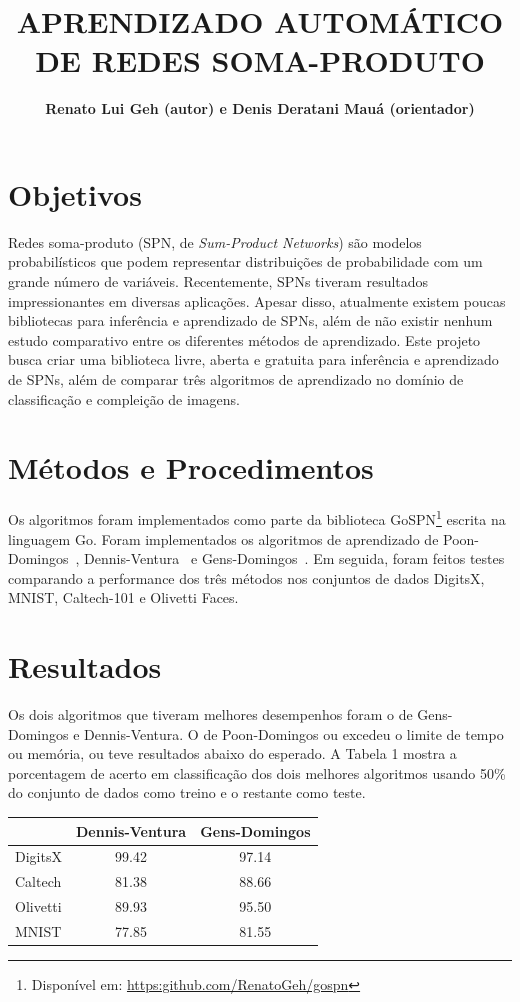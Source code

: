 \documentclass[10pt,a4paper]{article}
\title{APRENDIZADO AUTOMÁTICO DE REDES SOMA-PRODUTO}
\author{\textbf{Renato Lui Geh (autor) e Denis Deratani Mauá (orientador)}}
\affil{Instituto de Matemática e Estatística, Universidade de São Paulo}
\affil{\fontsize{10pt}{12}\selectfont\{renatolg,ddm\}@ime.usp.br}
\date{}
\begin{document}
\maketitle

\begin{multicols*}{2}

\section*{Objetivos}

Redes soma-produto (SPN, de \textit{Sum-Product Networks}) são modelos probabilísticos que podem
representar distribuições de probabilidade com um grande número de variáveis.  Recentemente, SPNs
tiveram resultados impressionantes em diversas aplicações.  Apesar disso, atualmente existem poucas
bibliotecas para inferência e aprendizado de SPNs, além de não existir nenhum estudo comparativo
entre os diferentes métodos de aprendizado.  Este projeto busca criar uma biblioteca livre, aberta
e gratuita para inferência e aprendizado de SPNs, além de comparar três algoritmos de aprendizado
no domínio de classificação e compleição de imagens.

\section*{Métodos e Procedimentos}

Os algoritmos foram implementados como parte da biblioteca GoSPN\footnote{Disponível em:
  \url{https:github.com/RenatoGeh/gospn}} escrita na linguagem Go.  Foram implementados os
algoritmos de aprendizado de Poon-Domingos~\cite{poon-domingos}, Dennis-Ventura~\cite{clustering} e
Gens-Domingos~\cite{gens-domingos}. Em seguida, foram feitos testes comparando a performance dos
três métodos nos conjuntos de dados DigitsX, MNIST, Caltech-101 e Olivetti Faces.

\section*{Resultados}

Os dois algoritmos que tiveram melhores desempenhos foram o de Gens-Domingos e Dennis-Ventura. O de
Poon-Domingos ou excedeu o limite de tempo ou memória, ou teve resultados abaixo do esperado. A
Tabela 1 mostra a porcentagem de acerto em classificação dos dois melhores algoritmos usando 50\%
do conjunto de dados como treino e o restante como teste.
\vspace{-0.2cm}
\begin{tabular}{l|c|c}
  & Dennis-Ventura & Gens-Domingos\\
  \hline
  DigitsX & 99.42 & 97.14\\
  Caltech & 81.38 & 88.66\\
  Olivetti& 89.93 & 95.50\\
  MNIST   & 77.85 & 81.55\\
\end{tabular}


\end{multicols*}
\end{document}
